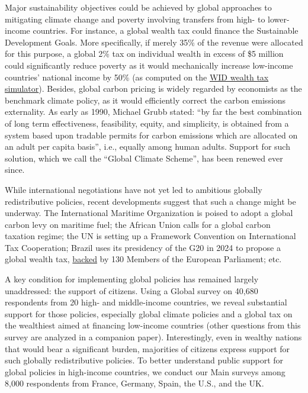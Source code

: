 Major sustainability objectives could be achieved by global approaches to mitigating climate change and poverty involving transfers from high- to lower-income countries.\citep{budolfson_climate_2021,franks_mobilizing_2018,dennig_inequality_2015,soergel_combining_2021,bauer_quantification_2020,cramton_global_2017} For instance, a global wealth tax could finance the Sustainable Development Goals.\citep{piketty_brief_2022} More specifically, if merely 35\% of the revenue were allocated for this purpose, a global 2\% tax on individual wealth in excess of \$5 million could significantly reduce poverty as it would mechanically increase low-income countries' national income by 50\% (as computed on the \href{https://wid.world/world-wealth-tax-simulator/}{WID wealth tax simulator}). Besides, global carbon pricing is widely regarded by economists as the benchmark climate policy, as it would efficiently correct the carbon emissions externality. As early as 1990, Michael Grubb stated:\cite{grubb_greenhouse_1990} ``by far the best combination of long term effectiveness, feasibility, equity, and simplicity, is obtained from a system based upon tradable permits for carbon emissions which are allocated on an adult per capita basis'', i.e., equally among human adults. Support for such solution, which we call the ``Global Climate Scheme'', has been renewed ever since.\citep{hoel_carbon_1991,agarwal_global_1991,bertram_tradeable_1992,baer_equity_2000,jamieson_climate_2001,blanchard_major_2021,rajan_global_2021} 

While international negotiations have not yet led to ambitious globally redistributive policies, recent developments suggest that such a change might be underway. The International Maritime Organization is poised to adopt a global carbon levy on maritime fuel; the African Union calls for a global carbon taxation regime;\cite{african_union_african_2023} the UN is setting up a Framework Convention on International Tax Cooperation;\cite{un_promotion_2023} Brazil uses its presidency of the G20 in 2024 to propose a global wealth tax, %
\href{https://www.lemonde.fr/idees/article/2023/03/14/taxation-mondiale-sur-les-ultrariches-ce-que-nous-avons-reussi-pour-les-multinationales-nous-devons-le-faire-pour-les-grandes-fortunes_6165354_3232.html}{backed} by 130 Members of the European Parliament; etc. 

A key condition for implementing global policies has remained largely unaddressed: the support of citizens. Using a Global survey on 40,680 respondents from 20 high- and middle-income countries, we reveal substantial support for those policies, especially global climate policies and a global tax on the wealthiest aimed at financing low-income countries (other questions from this survey are analyzed in a companion paper\cite{dechezlepretre_fighting_2022}). Interestingly, even in wealthy nations that would bear a significant burden, majorities of citizens express support for such globally redistributive policies. To better understand public support for global policies in high-income countries, we conduct our Main surveys among 8,000 respondents from France, Germany, Spain, the U.S., and the UK. 

